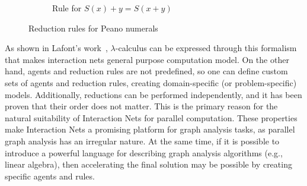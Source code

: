 \begin{figure}[htbp]
\begin{subfigure}[b]{0.45\textwidth}
\caption{ Rule for $S(x) + y = S(x + y)$}
\label{fig:peano_rules_x_y}
\end{subfigure}
\caption{Reduction rules for Peano numerals}
\label{fig:peano_rules}
\end{figure}

As shown in Lafont's work~\cite{10.1145/96709.96718}, $\lambda$-calculus can be expressed through this formalism that makes interaction nets general purpose computation model.
On the other hand, agents and reduction rules are not predefined, so one can define custom sets of agents and reduction rules, creating domain-specific (or problem-specific) models.
Additionally, reductions can be performed independently, and it has been proven that their order does not matter.
This is the primary reason for the natural suitability of Interaction Nets for parallel computation.
These properties make Interaction Nets a promising platform for graph analysis tasks, as parallel graph analysis has an irregular nature.
At the same time, if it is possible to introduce a powerful language for describing graph analysis algorithms (e.g., linear algebra), then accelerating the final solution may be possible by creating specific agents and rules. 

